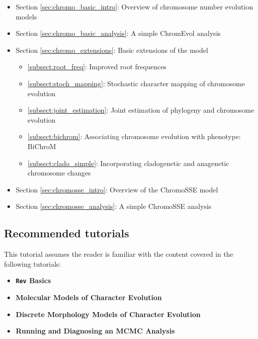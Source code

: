 \begin{itemize}
\item Section \ref{sec:chromo_basic_intro}: Overview of chromosome number evolution models
\item Section \ref{sec:chromo_basic_analysis}: A simple ChromEvol analysis
\item Section \ref{sec:chromo_extensions}: Basic extensions of the model
    \begin{itemize}
    \item \ref{subsect:root_freq}: Improved root frequences
    \item \ref{subsect:stoch_mapping}: Stochastic character mapping of chromosome evolution
    \item \ref{subsect:joint_estimation}: Joint estimation of phylogeny and chromosome evolution
    \item \ref{subsect:bichrom}: Associating chromosome evolution with phenotype: BiChroM
    \item \ref{subsect:clado_simple}: Incorporating cladogenetic and anagenetic chromosome changes
    \end{itemize}
\item Section \ref{sec:chromosse_intro}: Overview of the ChromoSSE model
\item Section \ref{sec:chromosse_analysis}: A simple ChromoSSE analysis
\end{itemize}

\subsection*{Recommended tutorials}

This tutorial assumes the reader is familiar with the content covered in the following \RevBayes tutorials:

\begin{itemize}
\item {\bf {\tt \large Rev} Basics}
\item {\bf Molecular Models of Character Evolution}
\item {\bf Discrete Morphology Models of Character Evolution}
\item {\bf Running and Diagnosing an MCMC Analysis}
\end{itemize}

\newpage
